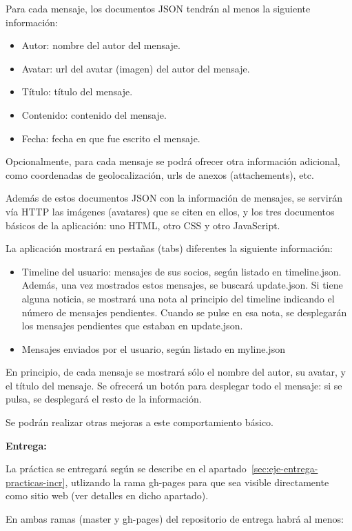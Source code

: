 Para cada mensaje, los documentos JSON tendrán al menos la siguiente información:

\begin{itemize}
\item Autor: nombre del autor del mensaje.
\item Avatar: url del avatar (imagen) del autor del mensaje.
\item Título: título del mensaje.
\item Contenido: contenido del mensaje.
\item Fecha: fecha en que fue escrito el mensaje.
\end{itemize}

Opcionalmente, para cada mensaje se podrá ofrecer otra información adicional, como coordenadas de geolocalización, urls de anexos (attachements), etc.

Además de estos documentos JSON con la información de mensajes, se servirán vía HTTP las imágenes (avatares) que se citen en ellos, y los tres documentos básicos de la aplicación: uno HTML, otro CSS y otro JavaScript.

La aplicación mostrará en pestañas (tabs) diferentes la siguiente información:

\begin{itemize}
\item Timeline del usuario: mensajes de sus socios, según listado en timeline.json. Además, una vez mostrados estos mensajes, se buscará update.json. Si tiene alguna noticia, se mostrará una nota al principio del timeline indicando el número de mensajes pendientes. Cuando se pulse en esa nota, se desplegarán los mensajes pendientes que estaban en update.json.
\item Mensajes enviados por el usuario, según listado en myline.json
\end{itemize}

En principio, de cada mensaje se mostrará sólo el nombre del autor, su avatar, y el título del mensaje. Se ofrecerá un botón para desplegar todo el mensaje: si se pulsa, se desplegará el resto de la información.

Se podrán realizar otras mejoras a este comportamiento básico.

\textbf{Entrega:}

La práctica se entregará según se describe en el apartado~\ref{sec:eje-entrega-practicas-incr}, utlizando la rama gh-pages para que sea visible directamente como sitio web (ver detalles en dicho apartado).

En ambas ramas (master y gh-pages) del repositorio de entrega habrá al menos:

